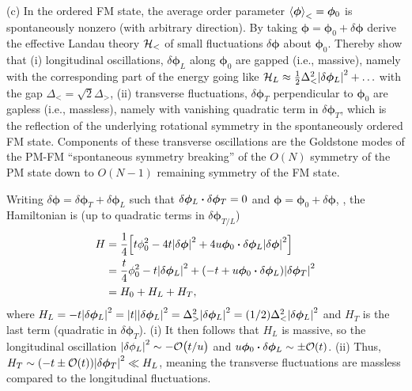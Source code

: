 \documentclass[12pt]{article}
\begin{document}
\begin{problem}{4}
(c) In the ordered FM state, the average order parameter
$\expval{\bm\phi}_<=\bm\phi_0$ is spontaneously nonzero (with arbitrary
direction). By taking $\bm\phi=\bm\phi_0+\delta\bm\phi$ derive the effective
Landau theory $\mathcal{H}_<$ of small fluctuations $\delta\bm\phi$ about $\bm\phi_0$.
Thereby show that (i) longitudinal oscillations, $\delta\bm\phi_L$ along
$\bm\phi_0$ are gapped (i.e., massive), namely with the corresponding part of
the energy going like
$\mathcal{H}_L\approx\frac12\Delta_<^2\abs{\delta\bm\phi_L}^2+\hdots$ with the gap
$\Delta_<=\sqrt2\Delta_>$, (ii) transverse fluctuations, $\delta\bm\phi_T$
perpendicular to $\bm\phi_0$ are gapless (i.e., massless), namely with vanishing
quadratic term in $\delta\bm\phi_T$, which is the reflection of the underlying
rotational symmetry in the spontaneously ordered FM state. Components of these
transverse oscillations are the Goldstone modes of the PM-FM ``spontaneous
symmetry breaking'' of the $O(N)$ symmetry of the PM state down to $O(N-1)$
remaining symmetry of the FM state.
\begin{solution}
Writing $\delta\bm\phi=\delta\bm\phi_T+\delta\bm\phi_L$ such that
$\delta\bm\phi_L\vdot\delta\bm\phi_T=0$ and $\bm\phi=\bm\phi_0+\delta\bm\phi$,
, the Hamiltonian is (up to quadratic terms in $\delta\bm\phi_{T/L}$)
\begin{align}
    H
    &=\frac14\qty[t\phi_0^2-4t\abs{\delta\bm\phi}^2
    +4u\bm\phi_0\vdot\delta\bm\phi_L\abs{\delta\bm\phi}^2] \notag\\
    &=\frac{t}{4}\phi_0^2-t\abs{\delta\bm\phi_L}^2
    +\qty(-t+u\bm\phi_0\vdot\delta\bm\phi_L)\abs{\delta\bm\phi_T}^2\notag\\
    &=H_0+H_L+H_T,
\end{align}
where
$H_L=-t\abs{\delta\bm\phi_L}^2=\abs{t}\abs{\delta\bm\phi_L}^2=\Delta_>^2\abs{\delta\bm\phi_L}^2=(1/2)\Delta_<^2\abs{\delta\bm\phi_L}^2$
and $H_T$ is the last term (quadratic in $\delta\bm\phi_T$). (i) It then 
follows that $H_L$ is massive, so the longitudinal
oscillation $\abs{\delta\phi_L}^2\sim -\order{t/u}$ and 
$u\bm\phi_0\vdot\delta\bm\phi_L\sim \pm \order{t}$. (ii) Thus, $H_T\sim(-t\pm
\order{t})\abs{\delta\bm\phi_T}^2\ll H_L$, meaning the transverse fluctuations 
are massless compared to the longitudinal fluctuations.
\end{solution}


\end{problem}
\end{document}
